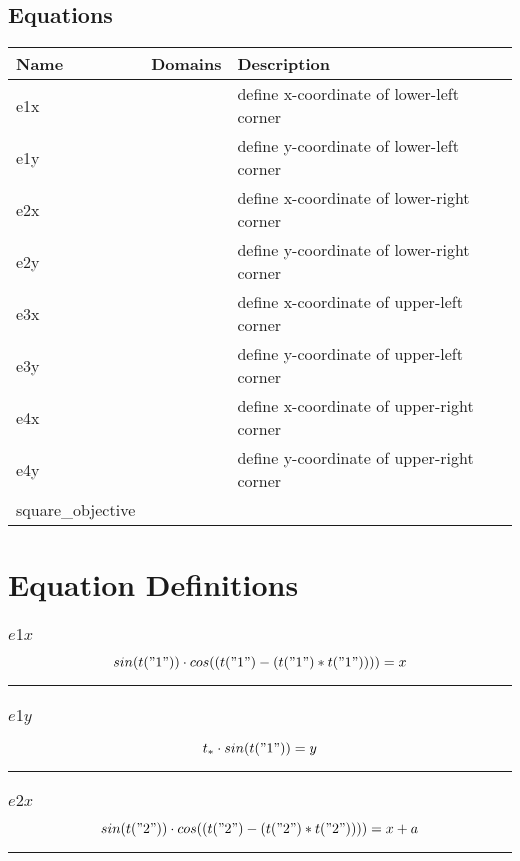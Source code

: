 \documentclass[11pt]{article}
\begin{document}
\subsection*{Equations}
\begin{tabularx}{\textwidth}{| l | l | X |}
\hline
\textbf{Name} & \textbf{Domains} & \textbf{Description}\\
\hline
\endhead

e1x &  & define x-coordinate of lower-left corner\\
e1y &  & define y-coordinate of lower-left corner\\
e2x &  & define x-coordinate of lower-right corner\\
e2y &  & define y-coordinate of lower-right corner\\
e3x &  & define x-coordinate of upper-left corner\\
e3y &  & define y-coordinate of upper-left corner\\
e4x &  & define x-coordinate of upper-right corner\\
e4y &  & define y-coordinate of upper-right corner\\
square\_objective &  & \\
\hline
\end{tabularx}
\section*{Equation Definitions}
\subsubsection*{$e1x$}
\begin{equation*}
 sin(t("1"))  \cdot  cos((t("1") - (t("1") * t("1"))))  = x
\end{equation*}
\vspace{5pt}
\hrule
\subsubsection*{$e1y$}
\begin{equation*}
t_{*} \cdot  sin(t("1"))  = y
\end{equation*}
\vspace{5pt}
\hrule
\subsubsection*{$e2x$}
\begin{equation*}
 sin(t("2"))  \cdot  cos((t("2") - (t("2") * t("2"))))  = x + a
\end{equation*}
\vspace{5pt}
\hrule
\end{document}
